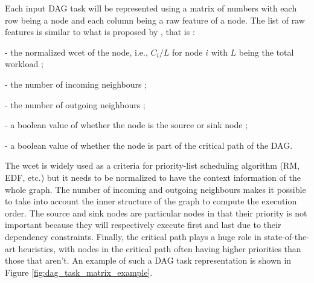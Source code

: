 Each input DAG  task will be represented using 
a matrix of numbers with each row being a node
and each column being a raw feature of a node.
The list of raw features is similar to what is proposed by \citet{Lee2021GlobalDagSchedDRL},
that is :
\begin{list}{}{}
    \item - the normalized wcet of the node, i.e., $C_i / L$ for node $i$ with $L$ being the total workload ;
    \item - the number of incoming neighbours ;
    \item - the number of outgoing neighbours ;
    \item - a boolean value of whether the node is the source or sink node ;
    \item - a boolean value of whether the node is part of the critical path of the DAG.
\end{list}

The wcet is widely used as a criteria for priority-list scheduling algorithm (RM, EDF\cite{buttazzo2005RMvsEDF}, etc.)
but it needs to be normalized to have the context information of the whole graph.
The number of incoming and outgoing neighbours makes it possible 
to take into account the inner structure of the graph to compute the execution order.
The source and sink nodes are particular nodes in that their priority
is not important because they will respectively execute first and last due to their dependency constraints.
Finally, the critical path plays a huge role in state-of-the-art heuristics\cite{He2019DagIntra}\cite{zhao2020DAGsched},
with nodes in the critical path often having higher priorities than those
that aren't.
An example of such a DAG task representation is shown in Figure \ref{fig:dag_task_matrix_example}.

